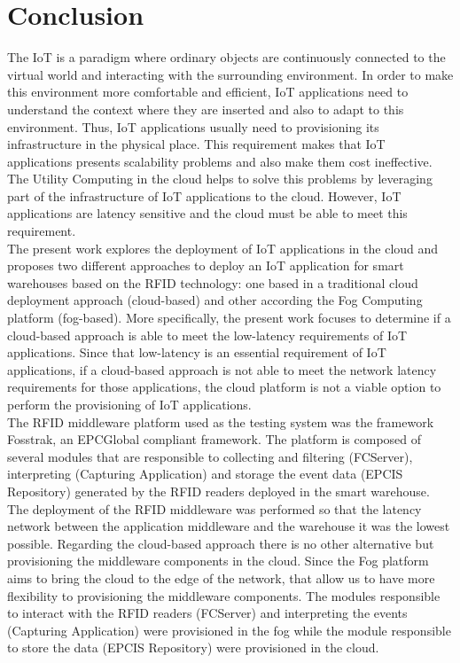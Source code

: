 
\chapter{Conclusion}
\label{chapter:conclusion}

The \acrfull{IoT} is a paradigm where ordinary objects are continuously connected to the virtual
world and interacting with the surrounding environment. In order to make this environment more comfortable and
efficient, \gls{IoT} applications need to understand the context where they are inserted and also to
adapt to this environment. Thus, \gls{IoT} applications usually need to provisioning its infrastructure
in the physical place. This requirement makes that \gls{IoT} applications presents scalability
problems and also make them cost ineffective. The Utility Computing in the cloud helps to solve this
problems by leveraging part of the infrastructure of \gls{IoT} applications to the cloud. However,
\gls{IoT} applications are latency sensitive and the cloud must be able to meet this requirement.\\

The present work explores the deployment of \gls{IoT} applications in the cloud and proposes
two different approaches to deploy an \gls{IoT} application for smart warehouses based on the
\gls{RFID} technology: one based in a traditional cloud deployment approach (cloud-based) and other
according the Fog Computing platform (fog-based). More specifically, the present work focuses to
determine if a cloud-based approach is able to meet the low-latency requirements of \gls{IoT}
applications. Since that low-latency is an essential requirement of \gls{IoT} applications, if a
cloud-based approach is not able to meet the network latency requirements for those applications,
the cloud platform is not a viable option to perform the provisioning of \gls{IoT} applications.\\

The \gls{RFID} middleware platform used as the testing system was the framework Fosstrak, an EPCGlobal
compliant framework. The platform is composed of several modules that are responsible to collecting
and filtering (FCServer), interpreting (Capturing Application) and storage the event data (EPCIS Repository)
generated by the \gls{RFID} readers deployed in the smart warehouse.\\

The deployment of the \gls{RFID} middleware was performed so that the latency network between the
application middleware and the warehouse it was the lowest possible. Regarding the cloud-based approach
there is no other alternative but provisioning the middleware components in the cloud. Since the Fog
platform aims to bring the cloud to the edge of the network, that allow us to have more flexibility
to provisioning the middleware components. The modules responsible to interact with the \gls{RFID}
readers (FCServer) and interpreting the events (Capturing Application) were provisioned in the fog while the module
responsible to store the data (EPCIS Repository) were provisioned in the cloud.\\

